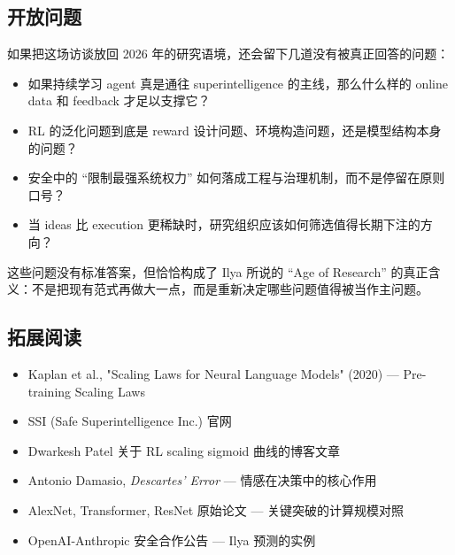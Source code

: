 \documentclass[a4paper]{article}
\begin{document}
\subsection{开放问题}

如果把这场访谈放回 2026 年的研究语境，还会留下几道没有被真正回答的问题：
\begin{itemize}
    \item 如果持续学习 agent 真是通往 superintelligence 的主线，那么什么样的 online data 和 feedback 才足以支撑它？
    \item RL 的泛化问题到底是 reward 设计问题、环境构造问题，还是模型结构本身的问题？
    \item 安全中的 ``限制最强系统权力'' 如何落成工程与治理机制，而不是停留在原则口号？
    \item 当 ideas 比 execution 更稀缺时，研究组织应该如何筛选值得长期下注的方向？
\end{itemize}

这些问题没有标准答案，但恰恰构成了 Ilya 所说的 ``Age of Research'' 的真正含义：不是把现有范式再做大一点，而是重新决定哪些问题值得被当作主问题。

\subsection{拓展阅读}

\begin{itemize}
    \item Kaplan et al., "Scaling Laws for Neural Language Models" (2020) --- Pre-training Scaling Laws
    \item SSI (Safe Superintelligence Inc.) 官网
    \item Dwarkesh Patel 关于 RL scaling sigmoid 曲线的博客文章
    \item Antonio Damasio, \textit{Descartes' Error} --- 情感在决策中的核心作用
    \item AlexNet, Transformer, ResNet 原始论文 --- 关键突破的计算规模对照
    \item OpenAI-Anthropic 安全合作公告 --- Ilya 预测的实例
\end{itemize}

\end{document}

